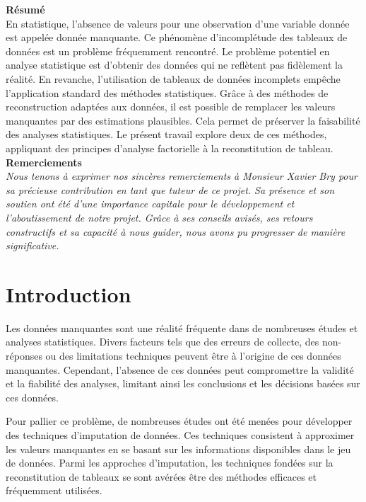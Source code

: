 \documentclass[12pt, openany, fleqn, french]{article}
\begin{document}
\newpage

  \noindent \textbf{\LARGE{Résumé}} \\

    En statistique, l’absence de valeurs pour une observation d’une variable donnée est appelée donnée manquante. Ce phénomène d'incomplétude des tableaux de données est un problème fréquemment rencontré.
    Le problème potentiel en analyse statistique est d'obtenir des données qui ne reflètent pas fidèlement la réalité.
    En revanche, l'utilisation de tableaux de données incomplets empêche l'application standard des méthodes statistiques.
    Grâce à des méthodes de reconstruction adaptées aux données, il est possible de remplacer les valeurs manquantes par des estimations plausibles. Cela permet de préserver la faisabilité des analyses statistiques. Le présent travail explore deux de ces méthodes, appliquant des principes d'analyse factorielle à la reconstitution de tableau.
    \\ [1.5cm] 
  
  \noindent \textbf{\LARGE{Remerciements}} \\

    \textit{Nous tenons à exprimer nos sincères remerciements à Monsieur Xavier Bry pour sa précieuse contribution en tant que tuteur de ce projet. Sa présence et son soutien ont été d'une importance capitale pour le développement et l'aboutissement de notre projet. Grâce à ses conseils avisés, ses retours constructifs et sa capacité à nous guider, nous avons pu progresser de manière significative.}


    

\newpage
\tableofcontents

\newpage
\section{Introduction}

    Les données manquantes sont une réalité fréquente dans de nombreuses études et analyses statistiques. Divers facteurs tels que des erreurs de collecte, des non-réponses ou des limitations techniques peuvent être à l'origine de ces données manquantes. Cependant, l'absence de ces données peut compromettre la validité et la fiabilité des analyses, limitant ainsi les conclusions et les décisions basées sur ces données.

    Pour pallier ce problème, de nombreuses études ont été menées pour développer des techniques d'imputation de données. Ces techniques consistent à approximer les valeurs manquantes en se basant sur les informations disponibles dans le jeu de données. Parmi les approches d'imputation, les techniques fondées sur la reconstitution de tableaux se sont avérées être des méthodes efficaces et fréquemment utilisées.
\end{document}
